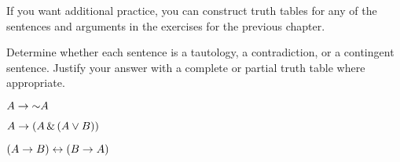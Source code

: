 
\practiceproblems

If you want additional practice, you can construct truth tables for any of the sentences and arguments in the exercises for the previous chapter.


\noindent\problempart
\label{pr.TT.TTorC}
Determine whether each sentence is a tautology, a contradiction, or a contingent sentence. Justify your answer with a complete or partial truth table where appropriate.


\begin{earg}
\item  $A \rightarrow \mathord{\sim} A$ \vspace{.5ex}							

%
\item $A \rightarrow (A \,\&\, (A \vee B))$ \vspace{.5ex}	

%

\item $(A \rightarrow B) \leftrightarrow (B \rightarrow A)$ 	\vspace{.5ex}				%
%
%
%


\end{earg}
